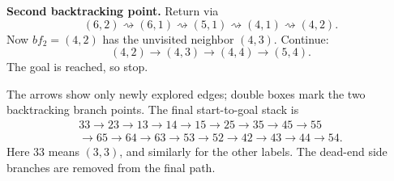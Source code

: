 \documentclass[11pt,a4paper]{article}
\begin{document}
\textbf{Second backtracking point.} Return via
\[
(6,2)\rightsquigarrow(6,1)\rightsquigarrow(5,1)\rightsquigarrow(4,1)\rightsquigarrow(4,2).
\]
Now $\boxed{bf_2=(4,2)}$ has the unvisited neighbor $(4,3)$. Continue:
\[
(4,2)\to(4,3)\to(4,4)\to\boxed{(5,4)}.
\]
The goal is reached, so stop.

\begin{center}\end{center}
The arrows show only newly explored edges; double boxes mark the two backtracking branch points. The final start-to-goal stack is
\begin{align*}
33\to23\to13\to14\to15\to25\to35\to45\to55\\
\to65\to64\to63\to53\to52\to42\to43\to44\to54.
\end{align*}
Here $33$ means $(3,3)$, and similarly for the other labels. The dead-end side branches are removed from the final path.
\end{document}
